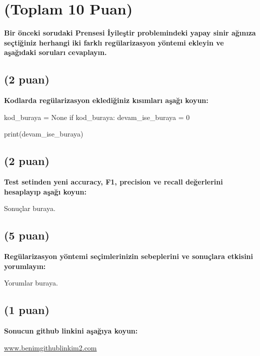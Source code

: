\documentclass[11pt]{article}
\begin{document}
\section{(Toplam 10 Puan)} \textbf{Bir önceki sorudaki Prensesi İyileştir problemindeki yapay sinir ağınıza seçtiğiniz herhangi iki farklı regülarizasyon yöntemi ekleyin ve aşağıdaki soruları cevaplayın.} 

\subsection{(2 puan)} \textbf{Kodlarda regülarizasyon eklediğiniz kısımları aşağı koyun:} 

\begin{python}
kod_buraya = None
if kod_buraya:
    devam_ise_buraya = 0

print(devam_ise_buraya)
\end{python}

\subsection{(2 puan)} \textbf{Test setinden yeni accuracy, F1, precision ve recall değerlerini hesaplayıp aşağı koyun:}

Sonuçlar buraya.

\subsection{(5 puan)} \textbf{Regülarizasyon yöntemi seçimlerinizin sebeplerini ve sonuçlara etkisini yorumlayın:}

Yorumlar buraya.

\subsection{(1 puan)} \textbf{Sonucun github linkini  aşağıya koyun:}

\url{www.benimgithublinkim2.com}
\end{document}
